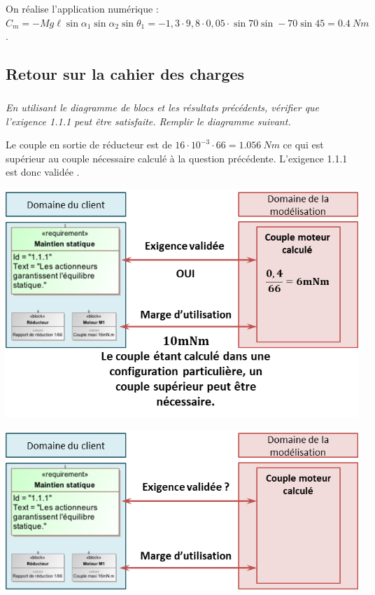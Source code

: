 \documentclass[10pt,fleqn]{article} %
\begin{document}
\begin{multicols}{2}
\begin{corrige}
\item On réalise l'application numérique : $C_m=-Mg\ell\sin\alpha_1\sin\alpha_2\sin\theta_1 =-1,3\cdot 9,8 \cdot 0,05 \cdot \sin  70 \sin -70 \sin 45 = \SI{0,4}{Nm}$.
\end{corrige}
\else\fi

\subsection*{Retour sur la cahier des charges}

\subparagraph{}
\textit{En utilisant le diagramme de blocs et les résultats précédents, vérifier que l'exigence 1.1.1 peut être satisfaite. Remplir le diagramme suivant.}

\ifprof
\begin{corrige}
Le couple en sortie de réducteur est de $16\cdot 10^{-3} \cdot 66 = \SI{1,056}{Nm}$ ce qui est supérieur au couple nécessaire calculé à la question précédente. L'exigence 1.1.1 est donc validée .
\begin{center}
\includegraphics[width=.5\linewidth]{images/cor_02}
\end{center}

\end{corrige}
\else
\fi

\ifprof
\else

\begin{center}
\includegraphics[width=\linewidth]{images/fig_06}
\end{center}
\fi


\end{multicols}
\end{document}
